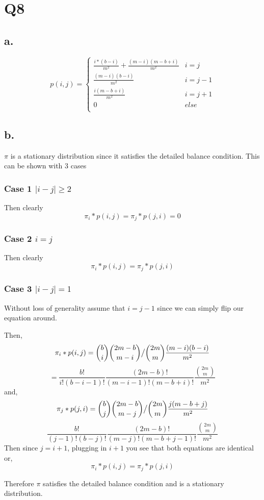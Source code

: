 \documentclass{article}
\begin{document}
\section*{Q8}
\subsection*{a.}
\[p(i,j) = 
\begin{cases}
\frac{i*(b-i)}{m^2} + \frac{(m-i)(m-b+i)}{m^2} & i = j\\
\frac{(m-i)(b-i)}{m^2} & i = j - 1\\
\frac{i(m-b+i)}{m^2} & i= j +1 \\
0 & else\\
\end{cases}
\] 

\subsection*{b.}
$\pi$ is a stationary distribution since it satisfies the detailed balance condition. 
This can be shown with 3 cases 
\subsubsection*{Case 1 $|i -j| \geq 2$}

Then clearly
\[
\pi_i*p(i,j) = \pi_j * p(j,i) = 0
\]

\subsubsection*{Case 2 $i = j$}
Then clearly
\[
\pi_i*p(i,j) = \pi_j * p(j,i)
\]
\subsubsection*{Case 3 $|i-j| = 1$}
Without loss of generality assume that $i = j -1$ since we can simply flip our equation around. 

Then, 
\[
\pi_i*p(i,j) = \binom{b}{i}\binom{2m-b}{m-i} \big{/} \binom{2m}{m} \frac{(m-i)(b-i)}{m^2}
\]
\[
= \frac{b!}{i!(b-i-1)!}\frac{(2m-b)!}{(m-i-1)!(m-b + i)!} \frac{\binom{2m}{m}}{m^2}
\]
and,
\[
\pi_j*p(j,i) = \binom{b}{j}\binom{2m-b}{m-j} \big{/} \binom{2m}{m} \frac{j(m-b+j)}{m^2}
\]
\[
\frac{b!}{(j-1)!(b-j)!}\frac{(2m-b)!}{(m-j)!(m-b + j - 1)!} \frac{\binom{2m}{m}}{m^2}
\]
Then since $j = i +1$, plugging in $i+1$ you see that both equations are identical or,
\[
\pi_i*p(i,j) = \pi_j * p(j,i)
\]

Therefore $\pi$ satisfies the detailed balance condition and is a stationary distribution.
\end{document}
